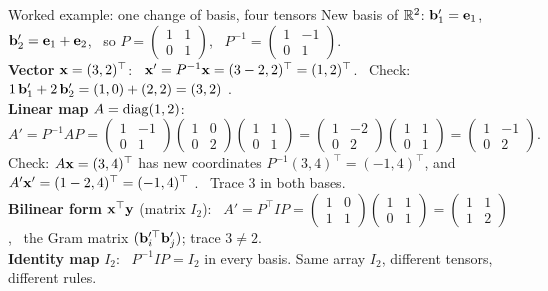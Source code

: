 \documentclass[aspectratio=1610,11pt]{beamer}
\begin{document}
\begin{frame}{Worked example: one change of basis, four tensors}
    \small
    New basis of $\mathbb{R}^2$: $\mathbf{b}_1' = \mathbf{e}_1$, $\mathbf{b}_2' = \mathbf{e}_1 + \mathbf{e}_2$, \ so $P = \begin{pmatrix} 1 & 1 \\ 0 & 1 \end{pmatrix}$, \ $P^{-1} = \begin{pmatrix} 1 & -1 \\ 0 & 1 \end{pmatrix}$.
    \\[0.3em]
    \textbf{Vector} $\mathbf{x} = (3, 2)^\top$: \ $\mathbf{x}' = P^{-1}\mathbf{x} = (3 - 2, 2)^\top = (1, 2)^\top$. \ Check: $1\,\mathbf{b}_1' + 2\,\mathbf{b}_2' = (1, 0) + (2, 2) = (3, 2)$ \checkmark.
    \\[0.3em]
    \textbf{Linear map} $A = \operatorname{diag}(1, 2)$:
    \[A' = P^{-1}AP = \begin{pmatrix} 1 & -1 \\ 0 & 1 \end{pmatrix}\begin{pmatrix} 1 & 0 \\ 0 & 2 \end{pmatrix}\begin{pmatrix} 1 & 1 \\ 0 & 1 \end{pmatrix} = \begin{pmatrix} 1 & -2 \\ 0 & 2 \end{pmatrix}\begin{pmatrix} 1 & 1 \\ 0 & 1 \end{pmatrix} = \begin{pmatrix} 1 & -1 \\ 0 & 2 \end{pmatrix}.\]
    Check: $A\mathbf{x} = (3, 4)^\top$ has new coordinates $P^{-1}(3, 4)^\top = (-1, 4)^\top$, and $A'\mathbf{x}' = (1 - 2, 4)^\top = (-1, 4)^\top$ \checkmark. \ Trace $3$ in both bases.
    \\[0.3em]
    \textbf{Bilinear form} $\mathbf{x}^\top\mathbf{y}$ (matrix $I_2$): \ $A' = P^\top I P = \begin{pmatrix} 1 & 0 \\ 1 & 1 \end{pmatrix}\begin{pmatrix} 1 & 1 \\ 0 & 1 \end{pmatrix} = \begin{pmatrix} 1 & 1 \\ 1 & 2 \end{pmatrix}$, \ the Gram matrix $(\mathbf{b}_i'^\top\mathbf{b}_j')$; trace $3 \neq 2$.
    \\[0.3em]
    \textbf{Identity map} $I_2$: \ $P^{-1}IP = I_2$ in every basis. Same array $I_2$, different tensors, different rules.
\end{frame}
\end{document}
